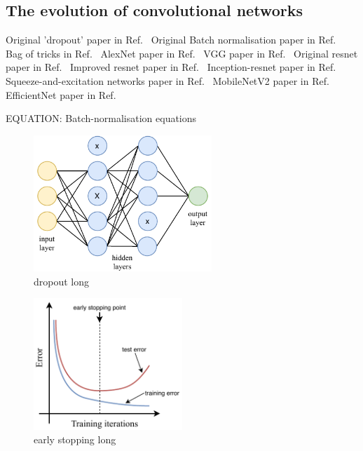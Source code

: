 \subsection{The evolution of convolutional networks} %
\label{sec:cvn_theory_architectures} %

Original 'dropout' paper in Ref.~\cite{hinton2012}
Original Batch normalisation paper in Ref.~\cite{ioffe2015}
Bag of tricks in Ref.~\cite{he2019}
AlexNet paper in Ref.~\cite{krizhevsky2012}
VGG paper in Ref.~\cite{simonyan2014}
Original resnet paper in Ref.~\cite{he2016_original}
Improved resnet paper in Ref.~\cite{he2016_improved}
Inception-resnet paper in Ref.~\cite{szegedy2016}
Squeeze-and-excitation networks paper in Ref.~\cite{hu2018}
MobileNetV2 paper in Ref.~\cite{sandler2018}
EfficientNet paper in Ref.~\cite{tan2019}

EQUATION: Batch-normalisation equations

\begin{figure} %
    \includegraphics[width=0.6\textwidth]{diagrams/7-cvn/dropout.pdf}
    \caption[dropout short]
    {dropout long}
    \label{fig:dropout}
\end{figure}

\begin{figure} %
    \includegraphics[width=0.5\textwidth]{diagrams/7-cvn/early_stopping.pdf}
    \caption[early stopping short]
    {early stopping long}
    \label{fig:early_stopping}
\end{figure}

